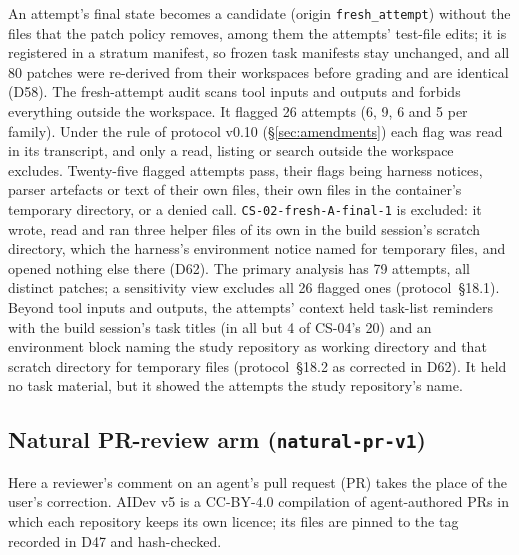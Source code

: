 An attempt's final state becomes a candidate (origin \texttt{fresh\_attempt}) without the files that the patch policy removes, among them the attempts' test-file edits; it is registered in a stratum manifest, so frozen task manifests stay unchanged, and all 80 patches were re-derived from their workspaces before grading and are identical (D58). The fresh-attempt audit scans tool inputs and outputs and forbids everything outside the workspace. It flagged 26 attempts (6, 9, 6 and 5 per family). Under the rule of protocol v0.10 (\S\ref{sec:amendments}) each flag was read in its transcript, and only a read, listing or search outside the workspace excludes. Twenty-five flagged attempts pass, their flags being harness notices, parser artefacts or text of their own files, their own files in the container's temporary directory, or a denied call. \texttt{CS-02-fresh-A-final-1} is excluded: it wrote, read and ran three helper files of its own in the build session's scratch directory, which the harness's environment notice named for temporary files, and opened nothing else there (D62). The primary analysis has 79 attempts, all distinct patches; a sensitivity view excludes all 26 flagged ones (protocol~\S18.1). Beyond tool inputs and outputs, the attempts' context held task-list reminders with the build session's task titles (in all but 4 of CS-04's 20) and an environment block naming the study repository as working directory and that scratch directory for temporary files (protocol~\S18.2 as corrected in D62). It held no task material, but it showed the attempts the study repository's name.

\subsection{Natural PR-review arm (\texttt{natural-pr-v1})}
\label{sec:natural}
Here a reviewer's comment on an agent's pull request (PR) takes the place of the user's correction. AIDev v5 \cite{li2025rise,li2026aidev,haoli2025aidev} is a CC-BY-4.0 compilation of agent-authored PRs in which each repository keeps its own licence; its files are pinned to the tag recorded in D47 and hash-checked.


